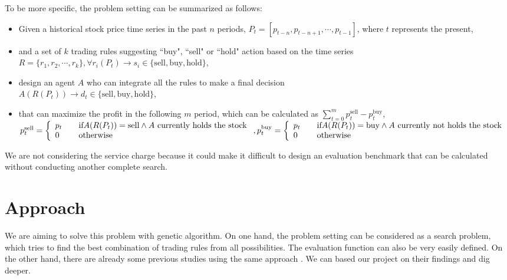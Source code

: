 \documentclass{article}
\begin{document}
To be more specific, the problem setting can be summarized as follows:
\begin{itemize}
	\item Given a historical stock price time series in the past $n$ periods, $P_t=\left[p_{t-n}, p_{t-n+1}, \cdots, p_{t-1}\right]$,
	      where $t$ represents the present,
	\item and a set of $k$ trading rules suggesting ``buy", ``sell" or ``hold" action based on the time series\\
	      $R=\{r_1, r_2, \cdots, r_k\}, \forall r_i(P_t) \rightarrow s_i \in \{\text{sell}, \text{buy}, \text{hold}\}$,
	\item design an agent $A$ who can integrate all the rules to make a final decision\\
	      $A(R(P_t)) \rightarrow d_t \in \{\text{sell}, \text{buy}, \text{hold}\}$,
	\item that can maximize the profit in the following $m$ period,
	      which can be calculated as $\sum \limits_{t=0}^{m} p_{t}^{\text{sell}} - p_{t}^{\text{buy}}$,\\
	      $p_{t}^{\text{sell}} = \left\{
		      \begin{array}{ll}
			      p_t \quad & \text{if} A(R(P_t)) = \text{sell} \wedge A \text{ currently holds the stock} \\
			      0 \quad   & \text{otherwise}
		      \end{array}\right.,\\
		      p_t^{\text{buy}} = \left\{
		      \begin{array}{ll}
			      p_t \quad & \text{if} A(R(P_t)) = \text{buy} \wedge A \text{ currently not holds the stock} \\
			      0 \quad   & \text{otherwise}
		      \end{array}
		      \right.$
\end{itemize}

We are not considering the service charge
because it could make it difficult to design an evaluation benchmark that can be
calculated without conducting another complete search.

\section{Approach}

We are aiming to solve this problem with genetic algorithm.
On one hand, the problem setting can be considered as a search problem,
which tries to find the best combination of trading rules from all possibilities.
The evaluation function can also be very easily defined.
On the other hand, there are already some previous studies using the same approach \cite{genetic-algorithms-for-predicting-the-egyptian-stock-market} \cite{genetic-algorithms-to-optimise-the-time-to-make-stock-market-investment}.
We can based our project on their findings and dig deeper.
\end{document}
